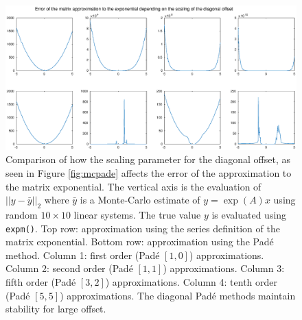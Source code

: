 \begin{figure}
    \centering
    \includegraphics[width=\linewidth]{Matlab/padevsserieserr.eps}
    \caption{
        Comparison of how the scaling parameter for the diagonal offset, as seen in Figure \ref{fig:mcpade} affects the error of the approximation to the matrix exponential.
        The vertical axis is the evaluation of $||y-\bar{y}||_2$ where $\bar{y}$ is a Monte-Carlo estimate of $y = \exp(A)x$ using random $10 \times 10$ linear systems.
        The true value $y$ is evaluated using \texttt{expm()}.
        Top row: approximation using the series definition of the matrix exponential.
        Bottom row: approximation using the Pad\'e method.
        Column 1: first order (Pad\'e $[1,0]$) approximations.
        Column 2: second order (Pad\'e $[1,1]$) approximations.
        Column 3: fifth order (Pad\'e $[3,2]$) approximations.
        Column 4: tenth order (Pad\'e $[5,5]$) approximations.
        The diagonal Pad\'e methods maintain stability for large offset.
    }
    \label{fig:padeserieserr}
\end{figure}

